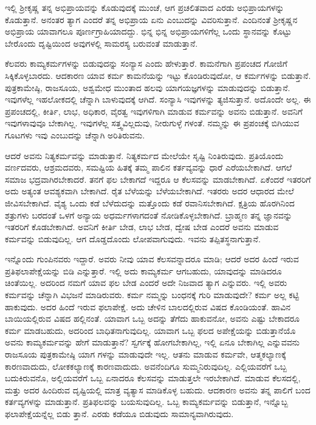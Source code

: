 ಇಲ್ಲಿ ಶ‍್ರೀಕೃಷ್ಣ ತನ್ನ ಅಭಿಪ್ರಾಯವನ್ನು ಕೊಡುವುದಕ್ಕೆ ಮುಂಚೆ, ಆಗ ಪ್ರಚಲಿತವಾದ ಎರಡು ಅಭಿಪ್ರಾಯಗಳನ್ನು ಕೊಡುತ್ತಾನೆ. ಅನಂತರ ತ್ಯಾಗ ಎಂದರೆ ತನ್ನ ಅಭಿಪ್ರಾಯ ಏನು ಎಂಬುದನ್ನು ವಿವರಿಸುತ್ತಾನೆ. ಎಂದಿನಂತೆ ಶ‍್ರೀಕೃಷ್ಣನ ಅಭಿಪ್ರಾಯ ಯಾವಾಗಲೂ ಪೂರ್ಣಗ್ರಾಹಿಯಾದದ್ದು. ಭಿನ್ನ ಭಿನ್ನ ಅಭಿಪ್ರಾಯಗಳಿಗೆಲ್ಲ ಒಂದು ಸ್ಥಾನವನ್ನು ಕೊಟ್ಟು ಬೇರೊಂದು ದೃಷ್ಟಿಯಿಂದ ಅವುಗಳಲ್ಲಿ ಸಾಮರಸ್ಯ ಬರುವಂತೆ ಮಾಡುತ್ತಾನೆ.

ಕೆಲವರು ಕಾಮ್ಯಕರ್ಮಗಳನ್ನು ಬಿಡುವುದನ್ನು ಸಂನ್ಯಾಸ ಎಂದು ಹೇಳುತ್ತಾರೆ. ಕಾಮನೆಗಾಗಿ ಪ್ರಪಂಚದ ಗೋಜಿಗೆ ಸಿಕ್ಕಿಕೊಳ್ಳಬಾರದು. ಆದಕಾರಣ ಯಾವ ಕರ್ಮ ಕಾಮನೆಯನ್ನು ಇಟ್ಟು ಕೊಂಡಿರುವುದೋ, ಆ ಕರ್ಮಗಳನ್ನು ಬಿಡುತ್ತಾನೆ. ಪುತ್ರಕಾಮೇಷ್ಠಿ, ರಾಜಸೂಯ, ಅಶ್ವಮೇಧ ಮುಂತಾದ ಹಲವು ಯಾಗಯಜ್ಞಗಳನ್ನು ಮಾಡುವುದನ್ನು ಬಿಡುತ್ತಾನೆ. ಇವುಗಳೆಲ್ಲ ಇಹಲೋಕದಲ್ಲಿ ಚೆನ್ನಾಗಿ ಬಾಳುವುದಕ್ಕೆ ಆಗಿದೆ. ಸಂನ್ಯಾಸಿ ಇವುಗಳನ್ನು ತ್ಯಜಿಸುತ್ತಾನೆ. ಅದೊಂದೇ ಅಲ್ಲ. ಈ ಪ್ರಪಂಚದಲ್ಲಿ, ಕೀರ್ತಿ, ಲಾಭ, ಅಧಿಕಾರ, ವೈರತ್ವ ಇವುಗಳಿಗಾಗಿ ಮಾಡುವ ಕರ್ಮವನ್ನು ಅವನು ಬಿಡುತ್ತಾನೆ. ಅವನಿಗೆ ಇವುಗಳಾವುವೂ ಬೇಕಾಗಿಲ್ಲ. ಇವುಗಳೆಲ್ಲ ಸತ್ತ್ವವಿಲ್ಲದುವು, ನೀರುಗುಳ್ಳೆ ಗಳಂತೆ. ನಮ್ಮನ್ನು ಈ ಪ್ರಪಂಚಕ್ಕೆ ಬಿಗಿಯುವ ಗೂಟಗಳು ಇವು ಎಂಬುದನ್ನು ಚೆನ್ನಾಗಿ ಅರಿತಿರುವನು.

ಆದರೆ ಅವನು ನಿತ್ಯಕರ್ಮವನ್ನು ಮಾಡುತ್ತಾನೆ. ನಿತ್ಯಕರ್ಮದ ಮೇಲೆಯೇ ಸೃಷ್ಟಿ ನಿಂತಿರುವುದು. ಪ್ರತಿಯೊಂದು ವರ್ಣದವರು, ಆಶ್ರಮದವರು, ಸಮಷ್ಟಿಯ ಹಿತಕ್ಕೆ ತಮ್ಮ ಪಾಲಿನ ಕರ್ತವ್ಯವನ್ನು ಧಾರೆ ಎರೆಯಬೇಕಾಗಿದೆ. ಆಗಲೆ ಸಮಾಜ ಭದ್ರವಾಗಿರಬೇಕಾದರೆ. ತನಗೆ ಫಲ ಬೇಕಾಗದೆ ಇದ್ದರೂ ಆ ಕೆಲಸವನ್ನು ಮಾಡಬೇಕಾಗಿದೆ. ಏಕೆಂದರೆ ಇತರರಿಗೆ ಅದು ಅತ್ಯಂತ ಆವಶ್ಯಕವಾಗಿ ಬೇಕಾಗಿದೆ. ರೈತ ಬೆಳೆಯನ್ನು ಬೆಳೆಯಬೇಕಾಗಿದೆ. ಇತರರು ಅದರ ಆಧಾರದ ಮೇಲೆ ಜೀವಿಸಬೇಕಾಗಿದೆ. ವೈಶ್ಯ ಒಂದು ಕಡೆ ಬೆಳೆದುದನ್ನು ಮತ್ತೊಂದು ಕಡೆ ರವಾನಿಸಬೇಕಾಗಿದೆ. ಕ್ಷತ್ರಿಯ ಹೊರಗಿನಿಂದ ಶತ್ರುಗಳು ಬರದಂತೆ ಒಳಗೆ ಅನ್ಯಾಯ ಅಧರ್ಮಗಳಾಗದಂತೆ ನೋಡಿಕೊಳ್ಳಬೇಕಾಗಿದೆ. ಬ್ರಾಹ್ಮಣ ತನ್ನ ಜ್ಞಾನವನ್ನು ಇತರರಿಗೆ ಕೊಡಬೇಕಾಗಿದೆ. ಅವನಿಗೆ ಕೀರ್ತಿ ಬೇಡ, ಲಾಭ ಬೇಡ, ದ್ವೇಷ ಬೇಡ ಎಂದರೆ ಅವನು ಮಾಡುವ ಕರ್ಮವನ್ನು ಬಿಡುವುದಿಲ್ಲ. ಆಗ ದೊಡ್ಡದೊಂದು ಲೋಪವಾಗುವುದು. ಇವನು ತಪ್ಪಿತಸ್ಥನಾಗುತ್ತಾನೆ.

ಇನ್ನೊಂದು ಗುಂಪಿನವರು ಇದ್ದಾರೆ. ಅವರು ನೀವು ಯಾವ ಕೆಲಸವನ್ನಾದರೂ ಮಾಡಿ; ಆದರೆ ಅದರ ಹಿಂದೆ ಇರುವ ಪ್ರತಿಫಲಾಪೇಕ್ಷೆಯನ್ನು ಬಿಡಿ ಎನ್ನುತ್ತಾರೆ. ಇಲ್ಲಿ ಅದು ಕಾಮ್ಯಕರ್ಮ ಆಗಬಹುದು, ಯಾವುದನ್ನು ಮಾಡಿದರೂ ಚಿಂತೆಯಿಲ್ಲ. ಅದರಿಂದ ನಮಗೆ ಯಾವ ಫಲ ಬೇಡ ಎಂದರೆ ಅದೇ ನಿಜವಾದ ತ್ಯಾಗ ಎನ್ನುವರು. ಇಲ್ಲಿ ಅವರು ಕರ್ಮವನ್ನು ಚೆನ್ನಾಗಿ ವಿಭಜನೆ ಮಾಡಿರುವರು. ಕರ್ಮ ನಮ್ಮನ್ನು ಬಂಧನಕ್ಕೆ ಗುರಿ ಮಾಡುವುದೇ? ಕರ್ಮ ಅಲ್ಲ ಕಟ್ಟಿ ಹಾಕುವುದು. ಅದರ ಹಿಂದೆ ಇರುವ ಫಲಾಪೇಕ್ಷೆ. ಅದು ಚೇಳಿನ ಬಾಲದಲ್ಲಿರುವ ವಿಷದ ಕೊಂಡಿಯಂತೆ. ಹಾವಿನ ಬಾಯಿಯಲ್ಲಿರುವ ವಿಷದ ಹಲ್ಲಿನಂತೆ. ಯಾವಾಗ ಒಬ್ಬ ಅದನ್ನು ತೆಗೆದು ಹಾಕುವನೋ, ಅವನು ಎಷ್ಟು ಬೇಕಾದರೂ ಕರ್ಮ ಮಾಡಬಹುದು, ಅದರಿಂದ ಬಾಧಿತನಾಗುವುದಿಲ್ಲ. ಯಾವಾಗ ಒಬ್ಬ ಫಲದ ಅಪೇಕ್ಷೆಯನ್ನು ಬಿಡುತ್ತಾನೆಯೊ ಅವನು ಕಾಮ್ಯಕರ್ಮವನ್ನು ಹೇಗೆ ಮಾಡುತ್ತಾನೆ? ಸ್ವರ್ಗಕ್ಕೆ ಹೋಗಬೇಕಾಗಿಲ್ಲ, ಇಲ್ಲಿ ಏನೂ ಬೇಕಾಗಿಲ್ಲ ಎನ್ನುವವನು ರಾಜಸೂಯ ಪುತ್ರಕಾಮೇಷ್ಠಿ ಯಾಗ ಗಳನ್ನು ಮಾಡುವುದೇ ಇಲ್ಲ. ಆತನು ಮಾಡುವ ಕರ್ಮವೇ, ಆತ್ಮಕಲ್ಯಾಣಕ್ಕೆ ಕಾರಣವಾದುದು, ಲೋಕಕಲ್ಯಾಣಕ್ಕೆ ಕಾರಣವಾದುದು. ಅವನೆಂದಿಗೂ ಸುಮ್ಮನಿರುವುದಿಲ್ಲ. ಎಲ್ಲಿಯವರೆಗೆ ಒಬ್ಬ ಬದುಕಿರುವನೊ, ಅಲ್ಲಿಯವರೆಗೆ ಒಬ್ಬ ಏನಾದರೂ ಕೆಲಸವನ್ನು ಮಾಡುತ್ತಲೇ ಇರಬೇಕಾಗಿದೆ. ಮಾಡುವ ಕೆಲಸದಲ್ಲಿ, ಮತ್ತು ಅದರ ಹಿಂದಿರುವ ದೃಷ್ಟಿಯಲ್ಲಿ ಮಾತ್ರ ವ್ಯತ್ಯಾಸ ಮಾಡಿಕೊಳ್ಳ ಬಹುದು. ಆದಕಾರಣ ಅವನು ತನ್ನ ಪಾಲಿಗೆ ಬಂದ ಕರ್ತವ್ಯಗಳನ್ನು ಮಾಡುತ್ತಾನೆ. ಪ್ರತಿಫಲವನ್ನು ಬಯಸುವುದಿಲ್ಲ. ಒಬ್ಬ ಕಾಮ್ಯಕರ್ಮವನ್ನು ಬಿಡುತ್ತಾನೆ, ಇನ್ನೊಬ್ಬ ಫಲಾಪೇಕ್ಷೆಯನ್ನೆಲ್ಲ ಬಿಡು ತ್ತಾನೆ. ಎರಡು ಕಡೆಯೂ ಬಿಡುವುದು ಸಾಮಾನ್ಯವಾಗಿರುವುದು.


